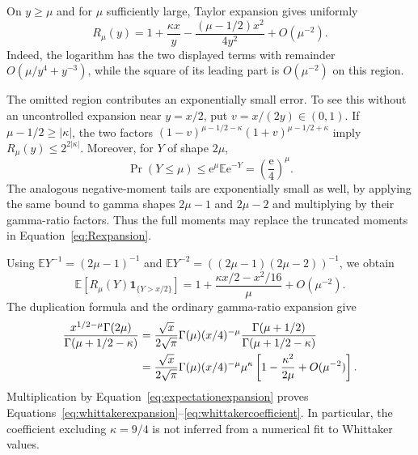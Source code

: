 \documentclass[11pt,letterpaper]{article}
\numberwithin{equation}{section}
\theoremstyle{definition}
\theoremstyle{remark}
\newcommand{\e}{\mathrm e}
\begin{document}
On $y\geq\mu$ and for $\mu$ sufficiently large, Taylor expansion gives uniformly
\begin{equation}
 R_\mu(y)=1+\frac{\kappa x}{y}
 -\frac{(\mu-1/2)x^2}{4y^2}+O(\mu^{-2}).
 \label{eq:Rexpansion}
\end{equation}
Indeed, the logarithm has the two displayed terms with remainder $O(\mu/y^4+y^{-3})$, while the square of its leading part is $O(\mu^{-2})$ on this region.

The omitted region contributes an exponentially small error. To see this without an uncontrolled expansion near $y=x/2$, put $v=x/(2y)\in(0,1)$. If $\mu-1/2\geq|\kappa|$, the two factors $(1-v)^{\mu-1/2-\kappa}(1+v)^{\mu-1/2+\kappa}$ imply $R_\mu(y)\leq2^{2|\kappa|}$. Moreover, for $Y$ of shape $2\mu$,
\[
 \Pr(Y\leq\mu)\leq\e^{\mu}\mathbb E\e^{-Y}
 =\left(\frac{\e}{4}\right)^\mu.
\]
The analogous negative-moment tails are exponentially small as well, by applying the same bound to gamma shapes $2\mu-1$ and $2\mu-2$ and multiplying by their gamma-ratio factors. Thus the full moments may replace the truncated moments in Equation~\eqref{eq:Rexpansion}.

Using $\mathbb E Y^{-1}=(2\mu-1)^{-1}$ and
$\mathbb E Y^{-2}=((2\mu-1)(2\mu-2))^{-1}$, we obtain
\begin{equation}
 \mathbb E\!\left[R_\mu(Y)\mathbf1_{\{Y>x/2\}}\right]
 =1+\frac{\kappa x/2-x^2/16}{\mu}+O(\mu^{-2}).
 \label{eq:expectationexpansion}
\end{equation}
The duplication formula and the ordinary gamma-ratio expansion give
\begin{align}
 \frac{x^{1/2-\mu}\Gamma(2\mu)}{\Gamma(\mu+1/2-\kappa)}
 &=\frac{\sqrt x}{2\sqrt\pi}\Gamma(\mu)(x/4)^{-\mu}
   \frac{\Gamma(\mu+1/2)}{\Gamma(\mu+1/2-\kappa)}\notag\\
 &=\frac{\sqrt x}{2\sqrt\pi}\Gamma(\mu)(x/4)^{-\mu}\mu^\kappa
   \left[1-\frac{\kappa^2}{2\mu}+O(\mu^{-2})\right].
 \label{eq:gammaratioappendix}
\end{align}
Multiplication by Equation~\eqref{eq:expectationexpansion} proves Equations~\eqref{eq:whittakerexpansion}--\eqref{eq:whittakercoefficient}. In particular, the coefficient excluding $\kappa=9/4$ is not inferred from a numerical fit to Whittaker values.
\end{document}
